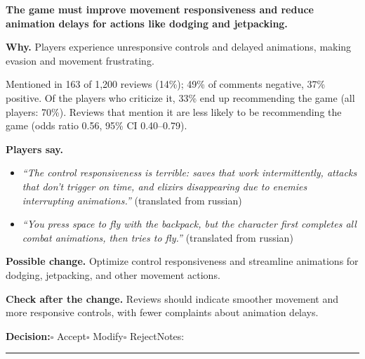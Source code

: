 \documentclass[10pt]{article}
\begin{document}
\begin{tcolorbox}[colback=white,colframe=gR,colbacktitle=lR,coltitle=black,title={\textbf{R2}\quad Movement and Evasion\hfill\textcolor{gR}{\textbf{Repair first}}},boxrule=0.8pt,arc=2pt,left=6pt,right=6pt,top=4pt,bottom=4pt,before skip=8pt,after skip=8pt]
{\large\textbf{The game must improve movement responsiveness and reduce animation delays for actions like dodging and jetpacking.}}

\smallskip
\textbf{Why.} Players experience unresponsive controls and delayed animations, making evasion and movement frustrating.

\smallskip
{\small Mentioned in 163 of 1,200 reviews (14\%); 49\% of comments negative, 37\% positive. Of the players who criticize it, 33\% end up recommending the game (all players: 70\%). Reviews that mention it are less likely to be recommending the game {\color{ink2}\footnotesize(odds ratio 0.56, 95\% CI 0.40--0.79)}.}

\smallskip
\textbf{Players say.}
\begin{itemize}[leftmargin=12pt,itemsep=1pt,topsep=2pt]
    \item \textit{``The control responsiveness is terrible: saves that work intermittently, attacks that don't trigger on time, and elixirs disappearing due to enemies interrupting animations.''} {\footnotesize(translated from russian)}
    \item \textit{``You press space to fly with the backpack, but the character first completes all combat animations, then tries to fly.''} {\footnotesize(translated from russian)}
\end{itemize}
\textbf{Possible change.} Optimize control responsiveness and streamline animations for dodging, jetpacking, and other movement actions.

\smallskip
\textbf{Check after the change.} Reviews should indicate smoother movement and more responsive controls, with fewer complaints about animation delays.

\medskip
{\small\textbf{Decision:}\quad $\square$ Accept\quad $\square$ Modify\quad $\square$ Reject\qquad Notes: \rule{0.38\linewidth}{0.4pt}}
\end{tcolorbox}
\end{document}
